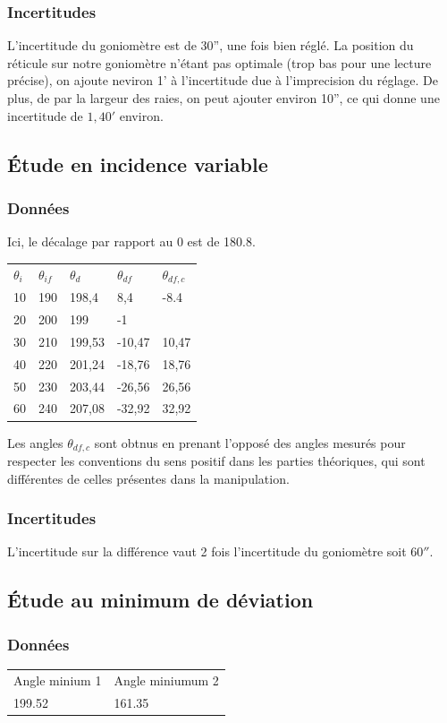 \documentclass[a4paper,10pt,french]{scrartcl}
\begin{document}
\subsubsection{Incertitudes}
L'incertitude du goniomètre est de 30'', une fois bien réglé. La position du réticule sur notre goniomètre n'étant pas optimale (trop bas pour une lecture précise), on ajoute neviron 1' à l'incertitude due à l'imprecision du réglage. De plus, de par la largeur des raies, on peut ajouter environ 10'', ce qui donne une incertitude de \(1,40'\) environ.
\subsection{Étude en incidence variable}
\subsubsection{Données}
Ici, le décalage par rapport au 0 est de 180.8.
\begin{center}
\begin{tabular}{lllll}
\(\theta_i\) & \(\theta_{if}\) & \(\theta_d\) & \(\theta_{df}\) & \(\theta_{df,c}\)\\
10 & 190 & 198,4 & 8,4 & -8.4\\
20 & 200 & 199 & -1\\
30 & 210 & 199,53 & -10,47 & 10,47\\
40 & 220 & 201,24 & -18,76 & 18,76\\
50 & 230 & 203,44 & -26,56 & 26,56\\
60 & 240 & 207,08 & -32,92 & 32,92
\end{tabular}
\end{center}
Les angles \(\theta_{df,c}\) sont obtnus en prenant l'opposé des angles mesurés pour respecter les conventions du sens positif dans les parties théoriques, qui sont différentes de celles présentes dans la manipulation.
\subsubsection{Incertitudes}
L'incertitude sur la différence vaut 2 fois l'incertitude du goniomètre soit \(60''\).
\subsection{Étude au minimum de déviation}
\subsubsection{Données}
\begin{center}
\begin{tabular}{ll}
Angle minium 1 & Angle miniumum 2\\
199.52 & 161.35
\end{tabular}
\end{center}
\end{document}
